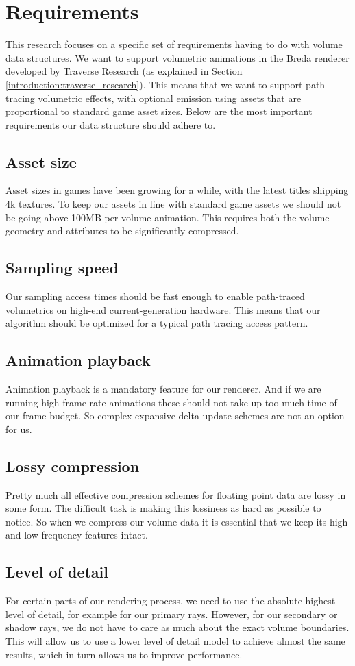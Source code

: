 \section{Requirements} \label{requirements}
This research focuses on a specific set of requirements having to do with volume data structures. We want to support volumetric animations in the Breda renderer developed by Traverse Research (as explained in Section \ref{introduction:traverse_research}). This means that we want to support path tracing volumetric effects, with optional emission using assets that are proportional to standard game asset sizes. Below are the most important requirements our data structure should adhere to.
\subsection{Asset size} \label{requirements:asset_size}
Asset sizes in games have been growing for a while, with the latest titles shipping 4k textures. To keep our assets in line with standard game assets we should not be going above 100MB per volume animation. This requires both the volume geometry and attributes to be significantly compressed.
\subsection{Sampling speed} \label{requirements:sampling_speed}
Our sampling access times should be fast enough to enable path-traced volumetrics on high-end current-generation hardware. This means that our algorithm should be optimized for a typical path tracing access pattern.
\subsection{Animation playback} \label{requirements:animation_playback}
Animation playback is a mandatory feature for our renderer. And if we are running high frame rate animations these should not take up too much time of our frame budget. So complex expansive delta update schemes are not an option for us.
\subsection{Lossy compression} \label{requirements:lossy_compression}
Pretty much all effective compression schemes for floating point data are lossy in some form. The difficult task is making this lossiness as hard as possible to notice. So when we compress our volume data it is essential that we keep its high and low frequency features intact.
\subsection{Level of detail} \label{requirements:level_of_detail}
For certain parts of our rendering process, we need to use the absolute highest level of detail, for example for our primary rays. However, for our secondary or shadow rays, we do not have to care as much about the exact volume boundaries. This will allow us to use a lower level of detail model to achieve almost the same results, which in turn allows us to improve performance.
